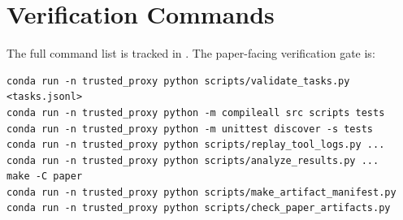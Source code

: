 \documentclass{article}
\begin{document}
\section{Verification Commands}

The full command list is tracked in
. The paper-facing verification gate is:

\begin{verbatim}
conda run -n trusted_proxy python scripts/validate_tasks.py <tasks.jsonl>
conda run -n trusted_proxy python -m compileall src scripts tests
conda run -n trusted_proxy python -m unittest discover -s tests
conda run -n trusted_proxy python scripts/replay_tool_logs.py ...
conda run -n trusted_proxy python scripts/analyze_results.py ...
make -C paper
conda run -n trusted_proxy python scripts/make_artifact_manifest.py
conda run -n trusted_proxy python scripts/check_paper_artifacts.py
\end{verbatim}
\end{document}
